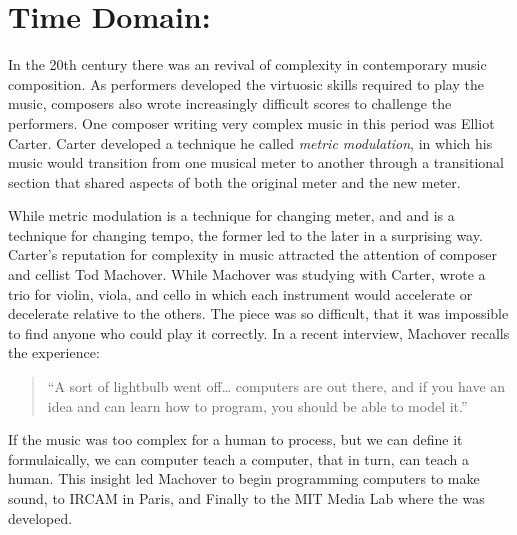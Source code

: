 \chapter{Time Domain: \polytempic}
\label{ch:polytempic}
In the 20th century there was an revival of complexity in contemporary
music composition. As performers developed the virtuosic skills required to
play the music, composers also wrote increasingly difficult scores to
challenge the performers.\cite{grout2006} One composer writing very
complex music in this period was Elliot Carter. Carter developed a
technique he called \textit{metric modulation}, in which his music
would transition from one musical meter to another through a
transitional section that shared aspects of both the original meter
and the new meter.

While metric modulation is a technique for changing meter, and
and \polytempic is a technique for changing tempo, the former led to
the later in a surprising way. Carter's reputation for complexity in
music attracted the attention of composer and cellist Tod
Machover. While Machover was studying with Carter, wrote a trio for
violin, viola, and cello in which each instrument would accelerate or
decelerate relative to the others. The piece was so difficult, that
it was impossible to find anyone who could play it correctly. In a
recent interview, Machover recalls the experience:
\begin{quotation}``A sort of lightbulb went off\ldots{} computers are out
  there, and if you have an idea and can learn how to program, you
  should be able to model it.''\cite{Fein2014}
\end{quotation}
If the music was too complex for a human to process, but we can define
it formulaically, we can computer teach a computer, that in turn, can
teach a human. This insight led Machover to begin programming
computers to make sound, to IRCAM in Paris, and Finally to the MIT
Media Lab where the \polytempic was developed.

